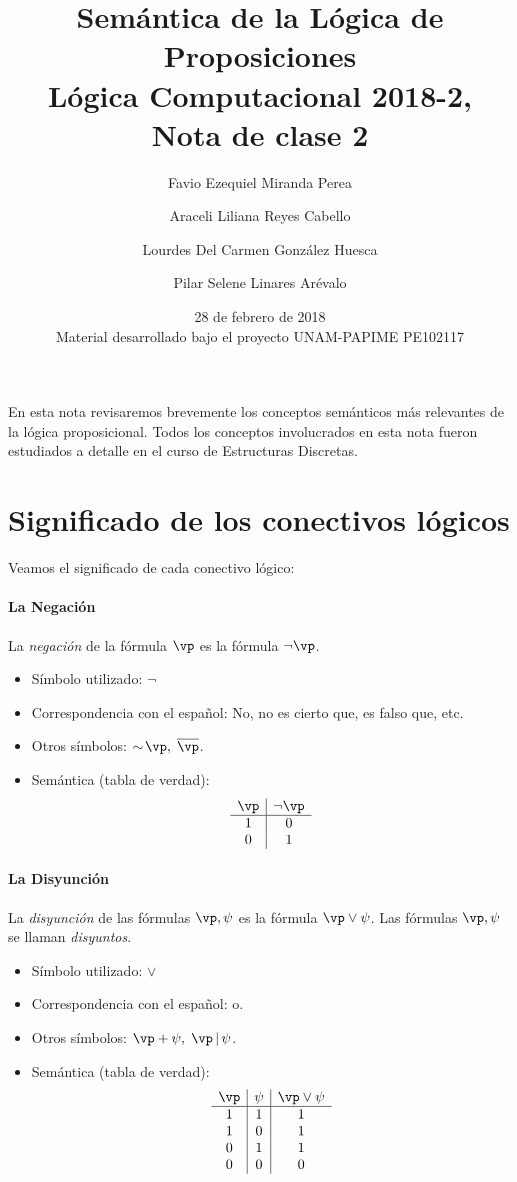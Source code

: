 \documentclass[11pt,letterpaper]{article}
\title{Sem\'antica de la L\'ogica de Proposiciones \\ 
L\'ogica Computacional 2018-2, Nota de clase 2}
\author{Favio Ezequiel Miranda Perea\and Araceli Liliana Reyes Cabello\and
Lourdes Del Carmen Gonz\'alez Huesca \and Pilar Selene Linares Ar\'evalo}
\date{28 de febrero de 2018 \\
Material desarrollado bajo el proyecto UNAM-PAPIME PE102117}
\begin{document}
\maketitle

En esta nota revisaremos brevemente los conceptos sem\'anticos m\'as relevantes 
de la l\'ogica proposicional. Todos los conceptos involucrados en esta nota 
fueron estudiados a detalle en el curso de Estructuras Discretas.

\section{Significado de los conectivos l\'ogicos}

\noindent Veamos el significado de cada conectivo l\'ogico:

\paragraph{La Negaci\'on}
La \emph{negaci\'on} de la f\'ormula $\vp$ es la f\'ormula $\lnot \vp$.

\begin{itemize}
 \item S\'imbolo utilizado:  $\lnot$ 
 \item Correspondencia con el espa\~nol: No, no es cierto que, es falso que, 
  etc.
 \item Otros s\'imbolos: $\sim\!\vp,\; \overline{\vp}$. 
 \item Sem\'antica (tabla de verdad):
  \[ 
   \begin{array}{c|c}
    \vp & \lnot \vp \\ \hline 
    1 & 0\\ 
    0 & 1 
   \end{array}
  \]
\end{itemize}


\paragraph{La Disyunci\'on}
La \emph{disyunci\'on} de las f\'ormulas $\vp,\psi$ es la f\'ormula
$\vp\lor \psi$. 
Las f\'ormulas $\vp,\psi$ se llaman \emph{disyuntos}. 

\begin{itemize}
 \item S\'imbolo utilizado: $\lor$
 \item Correspondencia con el espa\~nol: o. 
 \item Otros s\'imbolos: $\vp+\psi,\;\vp\,|\,\psi$. 
 \item Sem\'antica (tabla de verdad):  
  \[
   \begin{array}{c|c|c}
    \vp & \psi & \vp\lor \psi\\ \hline 
    1 & 1 & 1\\
    1 & 0 & 1\\
    0 & 1 & 1\\
    0 & 0 & 0\\
   \end{array}
  \]
\end{itemize}
\end{document}
